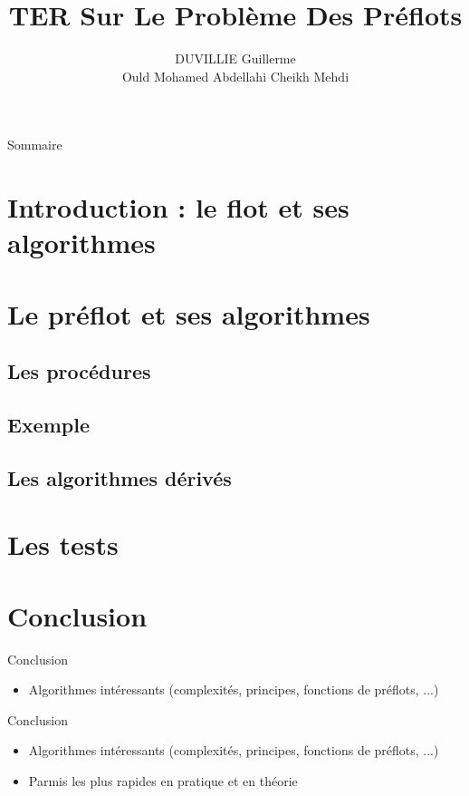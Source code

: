 \documentclass[hyperref={},
xcolor={dvipsnames,svgnames,table},10pt]{beamer}
\title{TER Sur Le Problème Des Préflots}
\author{DUVILLIE Guillerme \\ Ould Mohamed Abdellahi Cheikh Mehdi}
\institute{Université Montpellier2\\ Master1-Informatique\\ Spécialité-MOCA}
\begin{document}
\begin{frame}
	\titlepage 
\end{frame}


\begin{frame}{Sommaire}
  \tableofcontents
\end{frame} 

\section{Introduction : le flot et ses algorithmes}



\section{Le préflot et ses algorithmes}



\subsection{Les procédures}



\subsection{Exemple}


\subsection{Les algorithmes dérivés}


\section{Les tests}



\section{Conclusion}

\begin{frame}{Conclusion}
	\begin{itemize}
		\item Algorithmes intéressants (complexités, principes, fonctions de préflots, ...)
	\end{itemize}
\end{frame}

\begin{frame}{Conclusion}
	\begin{itemize}
		\item Algorithmes intéressants (complexités, principes, fonctions de préflots, ...)
		\item Parmis les plus rapides en pratique et en théorie
	\end{itemize}
\end{frame}
\end{document}
